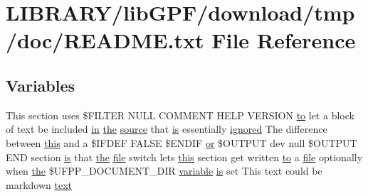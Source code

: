 \hypertarget{README_8txt}{}\section{L\+I\+B\+R\+A\+R\+Y/lib\+G\+P\+F/download/tmp/doc/\+R\+E\+A\+D\+ME.txt File Reference}
\label{README_8txt}
\subsection*{Variables}
\begin{DoxyCompactItemize}
\item 
This section uses \$F\+I\+L\+T\+ER N\+U\+LL C\+O\+M\+M\+E\+NT H\+E\+LP V\+E\+R\+S\+I\+ON \hyperlink{M__stopwatch_83_8txt_a97209fd3e34ef701c0a9734280779cbb}{to} let a block of text be included \hyperlink{M__journal_83_8txt_afce72651d1eed785a2132bee863b2f38}{in} \hyperlink{M__stopwatch_83_8txt_a0f266597de2e57eb3aa964927bb30e14}{the} \hyperlink{ufpp__overview_81_8txt_a4d6669ece605d05985c83a04dd38e0ad}{source} that \hyperlink{intro__blas1_83_8txt_a42a91df93f840595de3019ceb5d1df23}{is} essentially \hyperlink{ufpp__overview_81_8txt_a41b072d4e414a3fa706019354766d5a8}{ignored} The difference between \hyperlink{M__stopwatch_83_8txt_ad62a52042bb610eee5b36b5516caec22}{this} and a \$I\+F\+D\+EF F\+A\+L\+SE \$E\+N\+D\+IF \hyperlink{what__overview_81_8txt_a93f5d39a36ed511cc0dc88a20a517388}{or} \$O\+U\+T\+P\+UT dev null \$O\+U\+T\+P\+UT E\+ND section \hyperlink{intro__blas1_83_8txt_a42a91df93f840595de3019ceb5d1df23}{is} that \hyperlink{M__stopwatch_83_8txt_a0f266597de2e57eb3aa964927bb30e14}{the} \hyperlink{what__overview_81_8txt_a447b56c526e8da30e0dc94673727ee25}{file} switch lets \hyperlink{M__stopwatch_83_8txt_ad62a52042bb610eee5b36b5516caec22}{this} section get written \hyperlink{M__stopwatch_83_8txt_a97209fd3e34ef701c0a9734280779cbb}{to} a \hyperlink{what__overview_81_8txt_a447b56c526e8da30e0dc94673727ee25}{file} optionally when \hyperlink{M__stopwatch_83_8txt_a0f266597de2e57eb3aa964927bb30e14}{the} \$U\+F\+P\+P\+\_\+\+D\+O\+C\+U\+M\+E\+N\+T\+\_\+\+D\+IR \hyperlink{M__stopwatch_83_8txt_a2fa76741434e14a1b61bcbd4629b9cec}{variable} \hyperlink{intro__blas1_83_8txt_a42a91df93f840595de3019ceb5d1df23}{is} set This text could be markdown \hyperlink{README_8txt_afda9e6898bd09238e9e9be4c62ce246b}{text}
\item 

\end{DoxyCompactItemize}
